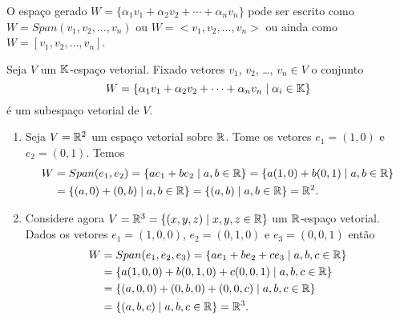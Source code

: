 \begin{notacao}
	O espaço gerado $W = \{\alpha_1v_1 + \alpha_2v_2 + \cdots + \alpha_nv_n\}$ pode ser escrito como $W = Span(v_1, v_2, \dots, v_n)$ ou $W = <v_1, v_2, \dots, v_n>$ ou ainda como $W = [v_1, v_2, \dots, v_n]$.
\end{notacao}

\begin{proposicao}
	Seja $V$ um $\mathbb{K}$-espaço vetorial. Fixado vetores $v_1$, $v_2$, \dots, $v_n \in V$ o conjunto
	\[
		W = \{\alpha_1v_1 + \alpha_2v_2 + \cdots + \alpha_nv_n \mid \alpha_i \in \mathbb{K}\}
	\]
	é um subespaço vetorial de $V$.
\end{proposicao}

\begin{exemplos}\label{exemplosespacosgerados}
    \begin{enumerate}
        \item\label{exemplor2} Seja $V = \mathbb{R}^2$ um espaço vetorial sobre $\mathbb{R}$. Tome os vetores $e_1 = (1,0)$ e $e_2 = (0, 1)$. Temos
        \begin{align*}
            W &= Span(e_1, e_2) = \{ae_1 + be_2 \mid a, b \in \mathbb{R}\} = \{a(1, 0) + b(0, 1) \mid a, b \in \mathbb{R}\} \\ &= \{(a, 0) + (0, b) \mid a, b \in \mathbb{R}\} = \{(a, b) \mid a, b \in \mathbb{R}\} = \mathbb{R}^2.
        \end{align*}

        \item\label{exemplor3} Considere agora $V = \mathbb{R}^3 = \{(x , y, z) \mid x, y, z \in \mathbb{R}\}$ um $\mathbb{R}$-espaço vetorial. Dados os vetores $e_1 = (1,0, 0)$, $e_2 = (0, 1, 0)$ e $e_3 = (0, 0, 1)$ então
        \begin{align*}
            W &= Span(e_1, e_2, e_3) = \{ae_1 + be_2 + ce_3 \mid a, b, c \in \mathbb{R}\} \\ &= \{a(1, 0, 0) + b(0, 1, 0) + c(0, 0, 1) \mid a, b, c \in \mathbb{R}\} \\ &= \{(a, 0, 0) + (0, b, 0) + (0, 0, c) \mid a, b, c \in \mathbb{R}\} \\ &= \{(a, b, c) \mid a, b, c \in \mathbb{R}\} = \mathbb{R}^3.
        \end{align*}


\end{enumerate}
\end{exemplos}
